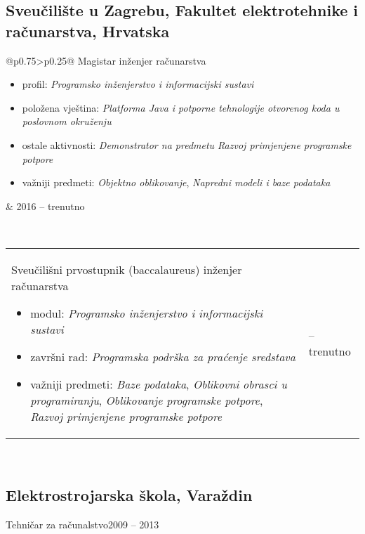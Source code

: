 \documentclass[a4paper]{article}
\makeatletter
\newlength{\tablewidth}
\newenvironment{period}[2]{%
\newcommand{\sarma}{#2}%
\setlength{\tablewidth}{\linewidth}
\addtolength{\tablewidth}{-2\tabcolsep}
\begin{tabular}{@{}p{0.75\tablewidth}>{\raggedleft\arraybackslash}p{0.25\tablewidth}@{}}%
#1 \newline
\begin{itemize}
}{%
\end{itemize} & \sarma \\%
\end{tabular}\\
}
\newenvironment{blank-period}[2]{%
\newcommand{\sarma}{#2}%
\setlength{\tablewidth}{\linewidth}
\addtolength{\tablewidth}{-2\tabcolsep}
\begin{tabular}{@{}p{0.75\tablewidth}>{\raggedleft\arraybackslash}p{0.25\tablewidth}@{}}%
#1 \newline & \sarma \\%
\end{tabular}\\
}
\makeatother
\begin{document}
\subsection{Sveu\v{c}ili\v{s}te u Zagrebu, Fakultet elektrotehnike i ra\v{c}unarstva, Hrvatska}
\begin{period}{Magistar in\v{z}enjer ra\v{c}unarstva}{2016 -- trenutno}
	\item profil:
		\textit{Programsko in\v{z}enjerstvo i informacijski sustavi}
	\item polo\v{z}ena vje\v{s}tina: 
		\textit{Platforma Java i potporne tehnologije otvorenog koda u poslovnom okru\v{z}enju}
	\item ostale aktivnosti:
		\textit{Demonstrator na predmetu Razvoj primjenjene programske potpore}
	\item va\v{z}niji predmeti:
		\textit{Objektno oblikovanje},
		\textit{Napredni modeli i baze podataka}
\end{period}
\begin{period}{Sveu\v{c}ili\v{s}ni prvostupnik (baccalaureus) in\v{z}enjer ra\v{c}unarstva}{2013 -- 2016}
	\item modul:
		\textit{Programsko in\v{z}enjerstvo i informacijski sustavi}
	\item zavr\v{s}ni rad:
		\textit{Programska podr\v{s}ka za pra\'{c}enje sredstava}
	\item va\v{z}niji predmeti:
		\textit{Baze podataka},
		\textit{Oblikovni obrasci u programiranju},
		\textit{Oblikovanje programske potpore},
		\textit{Razvoj primjenjene programske potpore}
\end{period}
\subsection{Elektrostrojarska \v{s}kola, Vara\v{z}din}
\begin{blank-period}{Tehni\v{c}ar za ra\v{c}unalstvo}{2009 -- 2013}
\end{blank-period}
\end{document}
